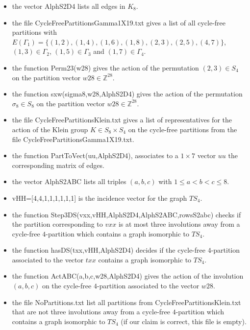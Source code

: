 \documentclass[reqno,11pt]{amsart}
\theoremstyle{definition}
\theoremstyle{remark}
\numberwithin{equation}{section}
\begin{document}
\begin{itemize}
\item the vector {\ttfamily  AlphS2D4} lists all edges in $K_8$. 
\item the file {\ttfamily CycleFreePartitionsGamma1X19.txt} gives a list of all cycle-free partitions with $E(\Gamma_1)=\{(1,2), (1,4), (1,6), (1,8), (2,3), (2,5), (4,7)\}$, $(1,3)\in \Gamma_2$, $(1,5)\in \Gamma_3$ and $(1,7)\in \Gamma_4$.
\item the function {\ttfamily Perm23(w28)} gives the action of the permutation $(2,3)\in S_4$ on the partition vector $w28\in \mathbb{Z}^{28}$. 
\item the function {\ttfamily sxw(sigma8,w28,AlphS2D4)} gives the action of the permutation $\sigma_8\in S_8$ on the partition vector $w28\in \mathbb{Z}^{28}$. 
\item the file {\ttfamily CycleFreePartitionsKlein.txt} gives a list of representatives for the action of the Klein group $K\in S_8\times S_4$ on the   cycle-free partitions from the file {\ttfamily CycleFreePartitionsGamma1X19.txt}.
\item the function {\ttfamily PartToVect(uu,AlphS2D4)},  associates to a $1\times 7$ vector $uu$ the corresponding matrix of edges.
\item the vector {\ttfamily AlphS2ABC} lists all triples $(a,b,c)$ with $1\leq a<b<c\leq 8$. 
\item {\ttfamily vHH=[4,4,1,1,1,1,1,1]} is the  incidence vector for the graph $TS_4$. 
\item the function {\ttfamily Step3DS(vxx,vHH,AlphS2D4,AlphS2ABC,rowsS2abc)} checks if the partition corresponding to $vxx$ is at most three involutions away from  a cycle-free $4$-partition which contains  a graph isomorphic to $TS_4$. 
\item the function {\ttfamily hasDS(txx,vHH,AlphS2D4)} decides if the cycle-free $4$-partition associated to the vector $txx$ contains a graph isomorphic to $TS_4$.
\item the function {\ttfamily ActABC(a,b,c,w28,AlphS2D4)} gives the action of the involution $(a,b,c)$ on the cycle-free $4$-partition associated to the vector $w28$. 
\item the file {\ttfamily NoPartitions.txt} list all partitions from {\ttfamily CycleFreePartitionsKlein.txt} that are not three involutions away from  a cycle-free $4$-partition which contains  a graph isomorphic to $TS_4$ (if our claim is correct, this file is empty). 
\end{itemize}
\end{document}
